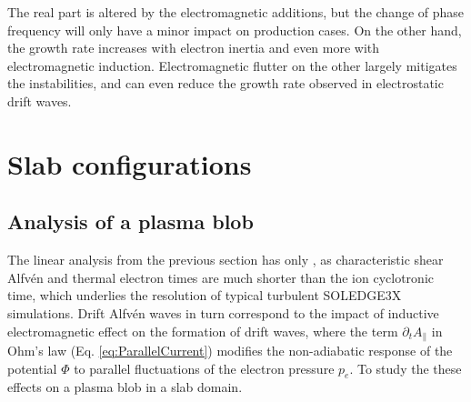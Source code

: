 The real part is altered by the electromagnetic additions, but the change of phase frequency will only have a minor impact on production cases. On the other hand, the growth rate increases with electron inertia and even more with electromagnetic induction. Electromagnetic flutter on the other largely mitigates the instabilities, and can even reduce the growth rate observed in electrostatic drift waves.



\section{Slab configurations}
\subsection{Analysis of a plasma blob}
\label{ssec:plasmablob}

The linear analysis from the previous section has only , as characteristic shear Alfvén and thermal electron times are much shorter than the ion cyclotronic time, which underlies the resolution of typical turbulent SOLEDGE3X simulations. Drift Alfvén waves in turn correspond to the impact of inductive electromagnetic effect on the formation of drift waves, where the term $\partial_t A_\parallel$ in Ohm's law (Eq. \ref{eq:ParallelCurrent}) modifies the non-adiabatic response of the potential $\Phi$ to parallel fluctuations of the electron pressure $p_e$. To study the these effects on a plasma blob in a slab domain. \newline

